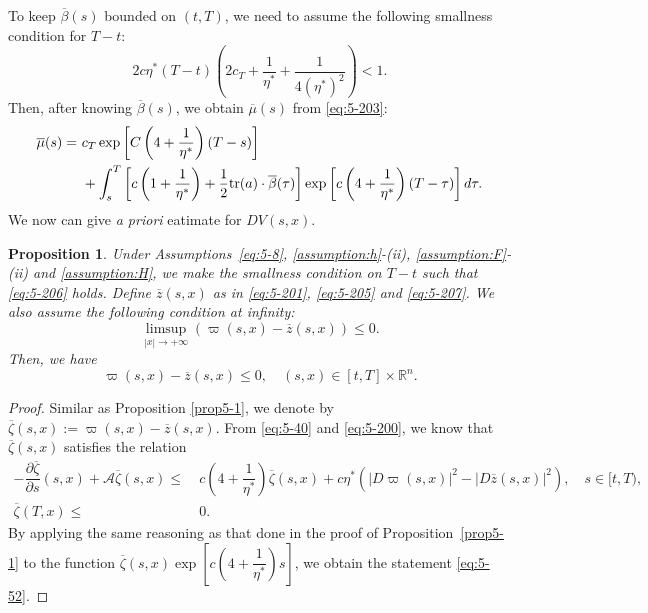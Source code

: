 \documentclass[11pt]{article}
\numberwithin{equation}{section}
\newtheorem{proposition}[theorem]{Proposition}
\newcommand{\brn}{{\mathbb{R}^n}}
\newcommand{\1}{\mbox{1\hspace{-1mm}I}}
\begin{document}
To keep $\overline{\beta}(s)$ bounded on $(t,T)$, we need to assume the following smallness condition for $T-t$:
\begin{equation}
    2c\eta^*(T-t)\left(2c_T+\frac{1}{\eta^*}+\dfrac{1}{4\left(\eta^*\right)^2}\right)<1. \label{eq:5-206}
\end{equation}
Then, after knowing $\overline{\beta}(s)$, we obtain $\overline{\mu}(s)$ from \eqref{eq:5-203}: 
\begin{align}
    \overline{\mu}(s)=\ & c_T\exp \left[C\left(4+\dfrac{1}{\eta^*}\right)(T-s)\right] \notag \\
    &+ \int_{s}^{T}\left[c\left(1+\dfrac{1}{\eta^*}\right)+\dfrac{1}{2}\text{tr}(a)\cdot \overline{\beta}(\tau)\right]\exp \left[c\left(4+\dfrac{1}{\eta^*}\right)(T-\tau)\right]d\tau.  \label{eq:5-207}
\end{align}
We now can give \textit{a priori} eatimate for $DV(s,x)$.

\begin{proposition}\label{prop5-3}
Under Assumptions~\ref{eq:5-8}, \ref{assumption:h}-(ii), \ref{assumption:F}-(ii) and \ref{assumption:H}, we make the smallness condition on $T-t$ such that \eqref{eq:5-206} holds. Define $\overline{z}(s,x)$ as in \eqref{eq:5-201}, \eqref{eq:5-205} and \eqref{eq:5-207}. We also assume the following condition at infinity:
\begin{equation}\label{eq:5-51}
    \limsup_{|x|\rightarrow+\infty}\left(\varpi(s,x)-\overline{z}(s,x)\right)\le 0.
\end{equation}
Then, we have 
\begin{equation}\label{eq:5-52}
    \varpi(s,x)-\overline{z}(s,x)\le 0,\quad (s,x)\in[t,T]\times\brn.
\end{equation}
\end{proposition}

\begin{proof}
Similar as Proposition \ref{prop5-1}, we denote by $\overline{\zeta}(s,x):=\varpi(s,x)-\overline{z}(s,x)$. From \eqref{eq:5-40} and \eqref{eq:5-200}, we know that $\overline{\zeta}(s,x)$ satisfies the relation 
\begin{align*}
    -\dfrac{\partial \overline{\zeta}}{\partial s}(s,x)+\mathcal{A}\overline{\zeta}(s,x)\le\ & c\left(4+\dfrac{1}{\eta^*}\right)\overline{\zeta}(s,x)+c\eta^*\left(|D\varpi(s,x)|^{2}-|D\overline{z}(s,x)|^{2}\right),\quad s\in[t,T),\\
    \overline{\zeta}(T,x)\le\ & 0.
\end{align*}
By applying the same reasoning as that done in the proof of Proposition~\ref{prop5-1} to the function $\overline{\zeta}(s,x)\exp \left[c\left(4+\dfrac{1}{\eta^*}\right)s\right]$, we obtain the statement \eqref{eq:5-52}. 
\end{proof}
\end{document}
